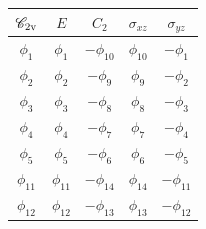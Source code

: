 \documentclass[a4paper]{book}
\begin{document}
\begin{solution}
\begin{enumerate}[label=(\alph*)]
		\begin{center}
		\begin{tabular}{ccccc}\hline
	$\mathscr{C}_{\rm 2v}$ & $E$ & $C_2$ &	$\sigma_{xz}$	& $\sigma_{yz}$	\\ \hline
			$\phi_1$	&	$\phi_1$	&	$-\phi_{10}$	&	$\phi_{10}$	&	$-\phi_1$	\\
			$\phi_2$	&	$\phi_2$	&	$-\phi_9$	&	$\phi_9$	&	$-\phi_2$		\\
			$\phi_3$	&	$\phi_3$	&	$-\phi_8$	&	$\phi_8$	&	$-\phi_3$		\\
			$\phi_4$	&	$\phi_4$	&	$-\phi_7$	&	$\phi_7$	&	$-\phi_4$		\\ 
			$\phi_5$	&	$\phi_5$	&	$-\phi_6$	&	$\phi_6$	&	$-\phi_5$		\\ 
			$\phi_{11}$	&	$\phi_{11}$	&	$-\phi_{14}$	&	$\phi_{14}$	&	$-\phi_{11}$		\\
			$\phi_{12}$	&	$\phi_{12}$	&	$-\phi_{13}$	&	$\phi_{13}$	&	$-\phi_{12}$		\\ \hline
		\end{tabular}
		\end{center}
		
		\end{enumerate}				
		
	\end{solution}
\end{document}
